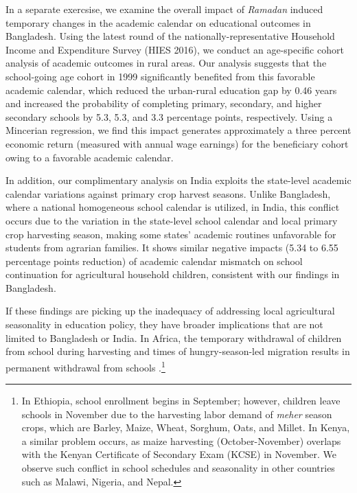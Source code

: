 \documentclass[12pt,letterpaper]{article}
\newcommand{\0}{\ensuremath{\mbox{\boldmath $0$}}}
\begin{document}
In a separate exercsise, we examine the overall impact of \textit{Ramadan} induced temporary changes in the academic calendar on educational outcomes in Bangladesh. Using the latest round of the nationally-representative Household Income and Expenditure Survey (HIES 2016), we conduct an age-specific cohort analysis of academic outcomes in rural areas. Our analysis suggests that the school-going age cohort in 1999 significantly benefited from this favorable academic calendar, which reduced the urban-rural education gap by 0.46 years and increased the probability of completing primary, secondary, and higher secondary schools by 5.3, 5.3, and 3.3 percentage points, respectively. Using a Mincerian regression, we find this impact generates approximately a three percent economic return (measured with annual wage earnings) for the beneficiary cohort owing to a favorable academic calendar.

In addition, our complimentary analysis on India exploits the state-level academic calendar variations against primary crop harvest seasons. Unlike Bangladesh, where a national homogeneous school calendar is utilized, in India, this conflict occurs due to the variation in the state-level school calendar and local primary crop harvesting season, making some states' academic routines unfavorable for students from agrarian families. It shows similar negative impacts (5.34 to 6.55 percentage points reduction) of academic calendar mismatch on school continuation for agricultural household children, consistent with our findings in Bangladesh.

If these findings are picking up the inadequacy of addressing local agricultural seasonality in education policy, they have broader implications that are not limited to Bangladesh or India. In Africa, the temporary withdrawal of children from school during harvesting and times of hungry-season-led migration results in permanent withdrawal from schools \citep{ andvig1999child, Colclough2000, Hadley2010, kadzamira2003can, WorldBank1998}.\footnote{In Ethiopia, school enrollment begins in September; however, children leave schools in November due to the harvesting labor demand of \textit{meher} season crops, which are Barley, Maize, Wheat, Sorghum, Oats, and Millet. In Kenya, a similar problem occurs, as maize harvesting (October-November) overlaps with the Kenyan Certificate of Secondary Exam (KCSE) in November. We observe such conflict in school schedules and seasonality in other countries such as Malawi, Nigeria, and Nepal. } 
\end{document}
